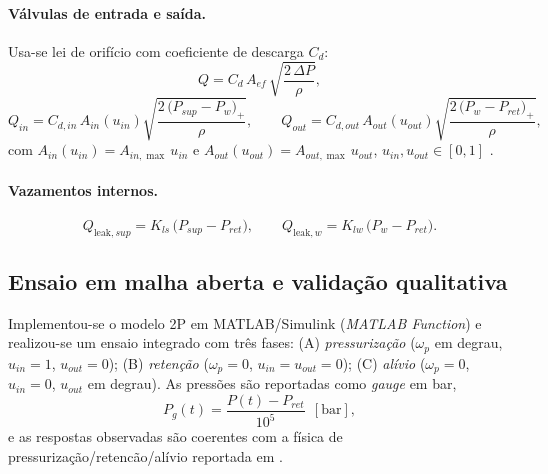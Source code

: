 \paragraph{Válvulas de entrada e saída.}
Usa-se lei de orifício com coeficiente de descarga $C_d$:
\begin{equation}
    Q = C_d\,A_{ef}\,\sqrt{\frac{2\,\Delta P}{\rho}},
    \label{eq:lei-orificio}
\end{equation}
\begin{equation}
    Q_{in}  = C_{d,in}\,A_{in}(u_{in})  \sqrt{\frac{2\,\big(P_{sup}-P_w\big)_{+}}{\rho}},
    \qquad
    Q_{out} = C_{d,out}\,A_{out}(u_{out})\sqrt{\frac{2\,\big(P_{w}-P_{ret}\big)_{+}}{\rho}},
    \label{eq:qin_qout}
\end{equation}
com $A_{in}(u_{in}) = A_{in,\max}\,u_{in}$ e $A_{out}(u_{out}) = A_{out,\max}\,u_{out}$, $u_{in},u_{out}\in[0,1]$ \cite{ProportionalPressureABS2023,Lv2014,ChenLv2017}.

\paragraph{Vazamentos internos.}
\begin{equation}
    Q_{\text{leak},sup} = K_{ls}\,\big(P_{sup}-P_{ret}\big),
    \qquad
    Q_{\text{leak},w}   = K_{lw}\,\big(P_{w}-P_{ret}\big).
    \label{eq:leaks}
\end{equation}

\subsection{Ensaio em malha aberta e validação qualitativa}
\label{sec:controle-ensaio-integrado}

Implementou-se o modelo 2P em MATLAB/Simulink (\emph{MATLAB Function}) e realizou-se um ensaio integrado com três fases: (A) \textit{pressurização} ($\omega_p$ em degrau, $u_{in}=1$, $u_{out}=0$); (B) \textit{retenção} ($\omega_p=0$, $u_{in}=u_{out}=0$); (C) \textit{alívio} ($\omega_p=0$, $u_{in}=0$, $u_{out}$ em degrau). As pressões são reportadas como \emph{gauge} em bar,
\begin{equation}
    P_{g}(t) = \frac{P(t)-P_{ret}}{10^5}\ \ [\text{bar}],
    \label{eq:pressao_gauge_bar}
\end{equation}
e as respostas observadas são coerentes com a física de pressurização/retencão/alívio reportada em \cite{ZengYangHuang2023,Lv2014,HouhuaJing2022}.

